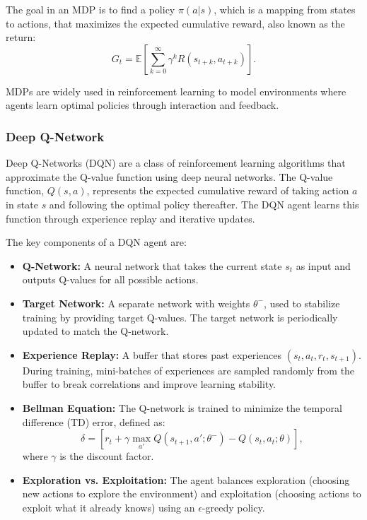 \documentclass[runningheads]{llncs}
\begin{document}
The goal in an MDP is to find a policy $\pi(a|s)$, which is a mapping from states to actions, that maximizes the expected cumulative reward, also known as the return:
\[
G_t = \mathbb{E} \left[ \sum_{k=0}^\infty \gamma^k R(s_{t+k}, a_{t+k}) \right].
\]

MDPs are widely used in reinforcement learning to model environments where agents learn optimal policies through interaction and feedback.

\subsubsection{Deep Q-Network}
Deep Q-Networks (DQN) are a class of reinforcement learning algorithms that approximate the Q-value function using deep neural networks. The Q-value function, $Q(s, a)$, represents the expected cumulative reward of taking action $a$ in state $s$ and following the optimal policy thereafter. The DQN agent learns this function through experience replay and iterative updates.

The key components of a DQN agent are:

\begin{itemize}
    \item \textbf{Q-Network:} A neural network that takes the current state $s_t$ as input and outputs Q-values for all possible actions. 
    \item \textbf{Target Network:} A separate network with weights $\theta^-$, used to stabilize training by providing target Q-values. The target network is periodically updated to match the Q-network.
    \item \textbf{Experience Replay:} A buffer that stores past experiences $(s_t, a_t, r_t, s_{t+1})$. During training, mini-batches of experiences are sampled randomly from the buffer to break correlations and improve learning stability.
    \item \textbf{Bellman Equation:} The Q-network is trained to minimize the temporal difference (TD) error, defined as:
    \[
    \delta = \left[ r_t + \gamma \max_{a'} Q(s_{t+1}, a'; \theta^-) - Q(s_t, a_t; \theta) \right],
    \]
    where $\gamma$ is the discount factor.
    \item \textbf{Exploration vs. Exploitation:} The agent balances exploration (choosing new actions to explore the environment) and exploitation (choosing actions to exploit what it already knows) using an $\epsilon$-greedy policy.
\end{itemize}
\end{document}
